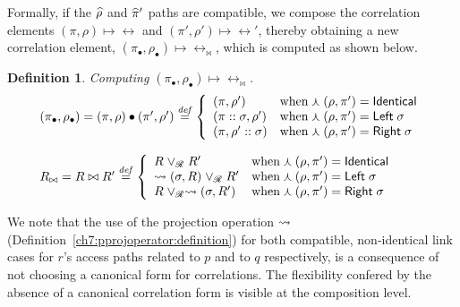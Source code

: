 \documentclass[11pt]{article}
\newtheorem{definition}{Definition}
\begin{document}
\begin{longtable}{l@{}l@{}}
\end{longtable}


Formally, if the $\widehat{\rho}$ and $\widehat{\pi}'$ paths are compatible, we 
compose the correlation elements $(\pi, \rho) \mapsto \rel$ and 
$(\pi', \rho') \mapsto \rel'$, thereby obtaining a new correlation 
element, $(\pi_{\bullet}, \rho_{\bullet}) \mapsto \rel_{\bowtie}$, which is  
computed as shown below.

\begin{definition}{Computing $(\pi_{\bullet}, \rho_{\bullet}) \mapsto \rel_{\bowtie}$.}\label{ch7:compcomposeelem:definition}
\[
\begin{array}{l}
 (\pi_{\bullet}, \rho_{\bullet}) =(\pi, \rho) \bullet (\pi', \rho') \overset{\mathit{def}}{=}
\left\{\begin{array}{ll}
         (\pi, \rho')            &{\textrm{when} \findl(\rho, \pi') = \identical}  \\
         (\pi :: \sigma, \rho')  &{\textrm{when} \findl(\rho, \pi') = \leftcase\; \sigma} \\         
         (\pi, \rho'::\sigma)    &{\textrm{when} \findl(\rho, \pi') = \rightcase\; \sigma}\\
\end{array}\right.\\\\
%
 \rel_{\bowtie} = {\rel} \bowtie \rel' \overset{\mathit{def}}{=}
\left\{\begin{array}{ll}
          \rel \rjoin \rel'&{\textrm{when} \findl(\rho, \pi') = \identical}  \\
          \pproj(\sigma, \rel) \rjoin \rel'  &{\textrm{when} \findl(\rho, \pi') = \leftcase\; \sigma} \\         
          \rel \rjoin \pproj(\sigma, \rel') &{\textrm{when} \findl(\rho, \pi') =  \rightcase\; \sigma}\\
\end{array}\right.
%
\end{array}
\]
\end{definition}
%
%
\noindent We note that the use of the projection operation $\rightsquigarrow$ 
(Definition~\ref{ch7:pprojoperator:definition}) for both compatible,
non-identical link cases for $r$'s access paths related to $p$ and to $q$
respectively, is a consequence of not choosing a canonical form for correlations.
The flexibility confered by the absence of a canonical correlation form is 
visible at the composition level.
   
\end{document}
